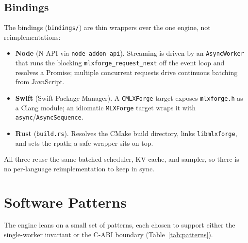 \documentclass[11pt,a4paper]{report}
\newcommand{\code}[1]{\texttt{#1}}
\begin{document}
\section{Bindings}
The bindings (\code{bindings/}) are thin wrappers over the one engine, not
reimplementations:
\begin{itemize}[nosep]
  \item \textbf{Node} (N-API via \code{node-addon-api}). Streaming is driven by an
        \code{AsyncWorker} that runs the blocking \code{mlxforge\_request\_next} off
        the event loop and resolves a Promise; multiple concurrent requests drive
        continuous batching from JavaScript.
  \item \textbf{Swift} (Swift Package Manager). A \code{CMLXForge} target exposes
        \code{mlxforge.h} as a Clang module; an idiomatic \code{MLXForge} target
        wraps it with \code{async}/\code{AsyncSequence}.
  \item \textbf{Rust} (\code{build.rs}). Resolves the CMake build directory, links
        \code{libmlxforge}, and sets the rpath; a safe wrapper sits on top.
\end{itemize}
All three reuse the same batched scheduler, KV cache, and sampler, so there is no
per-language reimplementation to keep in sync.

\chapter{Software Patterns}
\label{ch:patterns}

The engine leans on a small set of patterns, each chosen to support either the
single-worker invariant or the C-ABI boundary (Table~\ref{tab:patterns}).
\end{document}
